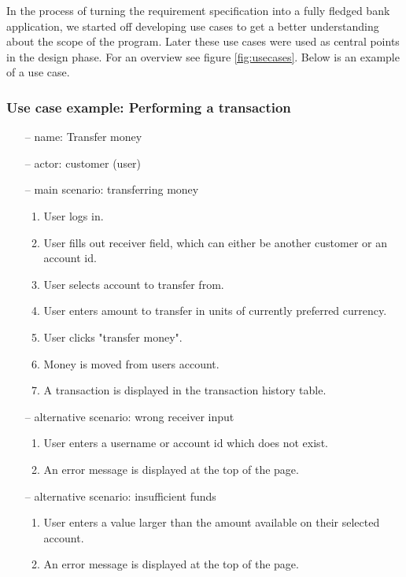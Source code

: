 In the process of turning the requirement specification into a fully fledged bank application, we started off developing use cases to get a better understanding about the scope of the program. Later these use cases were used as central points in the design phase. For an overview see figure \ref{fig:usecases}. Below is an example of a use case.

\subsubsection{Use case example: Performing a transaction}
\begin{itemize}
    \item[--] name: Transfer money
    \item[--] actor: customer (user)
    \item[--] main scenario: transferring money
        \begin{enumerate}
            \item User logs in.
            \item User fills out receiver field, which can either be another customer or an account id. 
            \item User selects account to transfer from.
            \item User enters amount to transfer in units of currently preferred currency.
            \item User clicks "transfer money". 
            \item Money is moved from users account.
            \item A transaction is displayed in the transaction history table. 
        \end{enumerate}
    \item[--] alternative scenario:  wrong receiver input
        \begin{enumerate}
            \item User enters a username or account id which does not exist.
            \item An error message is displayed at the top of the page. 
        \end{enumerate}
    \item[--] alternative scenario: insufficient funds
        \begin{enumerate}
            \item User enters a value larger than the amount available on their selected account. 
            \item An error message is displayed at the top of the page. 
        \end{enumerate} 
\end{itemize}
